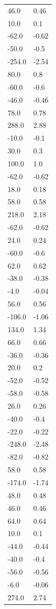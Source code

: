 \begin{longtable}{ll}
46.0 & 0.46 \\
10.0 & 0.1 \\
-62.0 & -0.62 \\
-50.0 & -0.5 \\
-254.0 & -2.54 \\
80.0 & 0.8 \\
-60.0 & -0.6 \\
-46.0 & -0.46 \\
78.0 & 0.78 \\
288.0 & 2.88 \\
-10.0 & -0.1 \\
30.0 & 0.3 \\
100.0 & 1.0 \\
-62.0 & -0.62 \\
18.0 & 0.18 \\
58.0 & 0.58 \\
218.0 & 2.18 \\
-62.0 & -0.62 \\
24.0 & 0.24 \\
-60.0 & -0.6 \\
62.0 & 0.62 \\
-38.0 & -0.38 \\
-4.0 & -0.04 \\
56.0 & 0.56 \\
-106.0 & -1.06 \\
134.0 & 1.34 \\
66.0 & 0.66 \\
-36.0 & -0.36 \\
20.0 & 0.2 \\
-52.0 & -0.52 \\
-58.0 & -0.58 \\
26.0 & 0.26 \\
-40.0 & -0.4 \\
-22.0 & -0.22 \\
-248.0 & -2.48 \\
-82.0 & -0.82 \\
58.0 & 0.58 \\
-174.0 & -1.74 \\
48.0 & 0.48 \\
46.0 & 0.46 \\
64.0 & 0.64 \\
10.0 & 0.1 \\
-44.0 & -0.44 \\
-40.0 & -0.4 \\
-56.0 & -0.56 \\
-6.0 & -0.06 \\
274.0 & 2.74 \\

\end{longtable}
